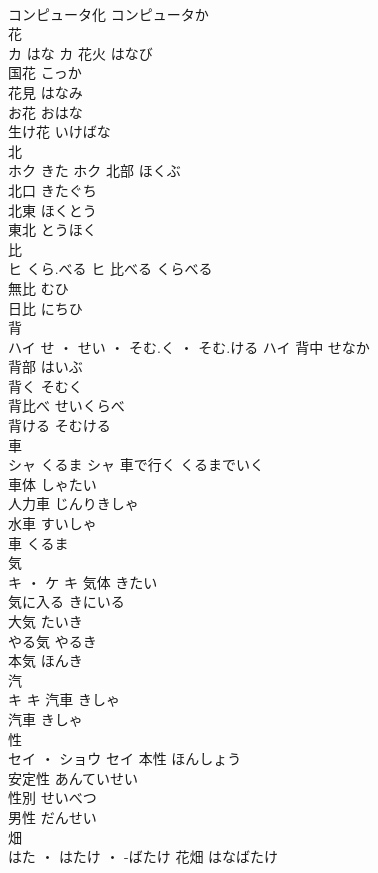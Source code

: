 \documentclass[8pt]{extreport}
\begin{document}
\begin{CJK}{UTF8}{min}
\\	コンピュータ化	コンピュータか	
\\	花	
\\	カ	はな	カ	花火	はなび	
\\	国花	こっか	
\\	花見	はなみ	
\\	お花	おはな	
\\	生け花	いけばな	
\\	北	
\\	ホク	きた	ホク	北部	ほくぶ	
\\	北口	きたぐち	
\\	北東	ほくとう	
\\	東北	とうほく	
\\	比	
\\	ヒ	くら.べる	ヒ	比べる	くらべる	
\\	無比	むひ	
\\	日比	にちひ	
\\	背	
\\	ハイ	せ ・ せい ・ そむ.く ・ そむ.ける	ハイ	背中	せなか	
\\	背部	はいぶ	
\\	背く	そむく	
\\	背比べ	せいくらべ	
\\	背ける	そむける	
\\	車	
\\	シャ	くるま	シャ	車で行く	くるまでいく	
\\	車体	しゃたい	
\\	人力車	じんりきしゃ	
\\	水車	すいしゃ	
\\	車	くるま	
\\	気	
\\	キ ・ ケ		キ	気体	きたい	
\\	気に入る	きにいる	
\\	大気	たいき	
\\	やる気	やるき	
\\	本気	ほんき	
\\	汽	
\\	キ		キ	汽車	きしゃ	
\\	汽車	きしゃ	
\\	性	
\\	セイ ・ ショウ		セイ	本性	ほんしょう	
\\	安定性	あんていせい	
\\	性別	せいべつ	
\\	男性	だんせい	
\\	畑	
\\	はた ・ はたけ ・ -ばたけ		花畑	はなばたけ	

\end{CJK}
\end{document}
